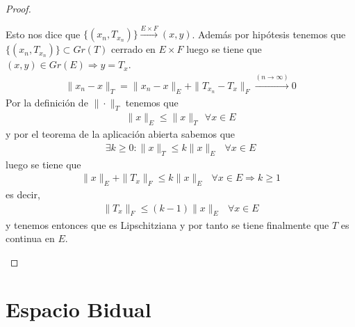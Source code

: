 \begin{teo}
\begin{proof}
\begin{itemize}
            Esto nos dice que $\{(x_n, T_{x_n})\} \overset{E\times F}{\longrightarrow} (x,y)$. Además por hipótesis tenemos que $\{(x_n, T_{x_n})\}\subset Gr(T)$ cerrado en $E\times F$ luego se tiene que $(x,y)\in Gr(E) \Rightarrow y = T_x$.
            \begin{gather*}
                \|x_n-x\|_T = \|x_n-x\|_E + \|T_{x_n} - T_x\|_F \overset{(n\to\infty)}{\longrightarrow} 0
            \end{gather*}
            Por la definición de $\|\cdot\|_T$ tenemos que 
            \begin{gather*}
                \|x\|_E \leq \|x\|_T\ \ \forall x \in E
            \end{gather*}
            y por el teorema de la aplicación abierta sabemos que 
            \begin{gather*}
                \exists k \geq 0 : \|x\|_T \leq k\|x\|_E\ \ \ \forall x \in E
            \end{gather*}
            luego se tiene que 
            \begin{gather*}
                \|x\|_E + \|T_x\|_F \leq k \|x\|_E\ \ \ \forall x \in E \Rightarrow k \geq 1
            \end{gather*}
            es decir, 
            \begin{gather*}
                \|T_x\|_F \leq (k-1)\|x\|_E \ \ \ \forall x \in E
            \end{gather*}
            y tenemos entonces que es Lipschitziana y por tanto se tiene finalmente que $T$ es continua en $E$.
        \end{itemize}
    \end{proof}
\end{teo}

\section{Espacio Bidual}

